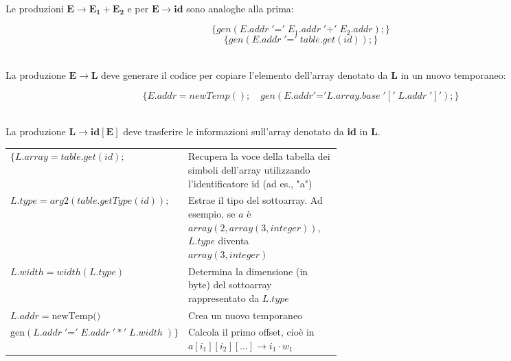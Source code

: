 \documentclass[11pt]{article}
\begin{document}
\noindent 
\\ Le produzioni $\mathbf{E\rightarrow E_1+E_2}$ e per $\mathbf{E\rightarrow id}$ sono analoghe 
alla prima:
\begin{tcolorbox}[colframe=black!10!black, colback=black!10!white]
  $$\{gen(E.addr \;'\mathord{=}'\; E_1.addr \;'\mathord{+}'\; E_2.addr );\}$$
  $$\{gen(E.addr \;'\mathord{=}'\; table.get(id) );\}$$
\end{tcolorbox}
\noindent 
\\ La produzione $\mathbf{E\rightarrow L}$ deve generare il codice per copiare l'elemento dell'array 
denotato da \textbf{L} in un nuovo temporaneo:
\begin{tcolorbox}[colframe=black!10!black, colback=black!10!white]
  $$\{E.addr = newTemp();\quad gen(E.addr '\mathord{=}' L.array.base\;'['\;L.addr\;']');\}$$
\end{tcolorbox}
\noindent 
\\ La produzione $\mathbf{L \rightarrow id[E]}$ deve trasferire le informazioni sull'array denotato 
da \textbf{id} in \textbf{L}.
\begin{tcolorbox}[colframe=black!10!black, colback=black!10!white]
  \begin{center}
    \begin{tabularx}{\linewidth}{l m{0.56\linewidth}}
      $\{L.array = table.get(id);$ 
      & \footnotesize Recupera la voce della tabella dei simboli dell'array utilizzando l'identificatore id (ad es., "a") \\[0.3cm]
      
      $L.type = arg2(table.getType(id));$ 
      & \footnotesize Estrae il tipo del sottoarray. Ad esempio, se $a$ è $array(2, array(3, integer))$, $L.type$ diventa $array(3, integer)$ \\[0.3cm]
      
      $L.width = width(L.type)$ 
      & \footnotesize Determina la dimensione (in byte) del sottoarray rappresentato da $L.type$ \\[0.3cm]
      
      $L.addr = \text{newTemp()}$ 
      & \footnotesize Crea un nuovo temporaneo \\ [0.3cm]
      
      $\text{gen}(L.addr \;'\mathord{=}'\;E.addr \;'*'\; L.width\; )\}$ 
      & \footnotesize Calcola il primo offset, cioè in $a[i_1][i_2][...] \rightarrow i_1 \cdot w_1$ \\
    \end{tabularx}
  \end{center}
\end{tcolorbox}
\end{document}
